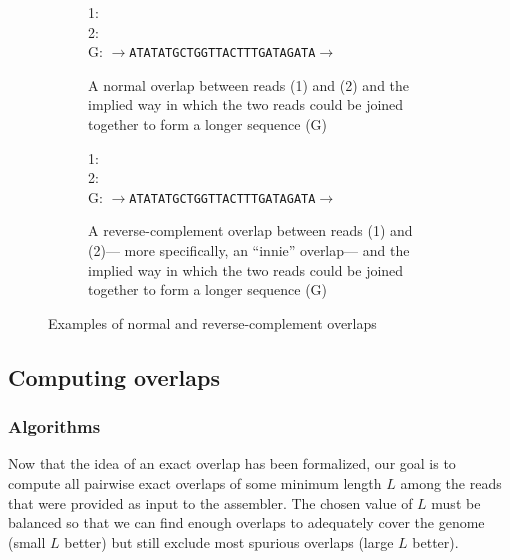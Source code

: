 \documentclass[12pt]{article}
\begin{document}
\begin{figure}
	\centering
	\begin{subfigure}[t]{0.455\textwidth}
		1:  \\
		2:  \\
		G: {\tt $\rightarrow$ATATATGCTGGTTACTTTGATAGATA$\rightarrow$}
		\caption{A normal overlap between reads (1) and (2) and the
		implied way in which the two reads could be joined together to
		form a longer sequence (G)}
	\end{subfigure}
		\hspace{0.07\textwidth}
	\begin{subfigure}[t]{0.455\textwidth}
		1:  \\
		2:  \\
		G: {\tt $\rightarrow$ATATATGCTGGTTACTTTGATAGATA$\rightarrow$}
		\caption{A reverse-complement overlap between reads (1) and
		(2)--- more specifically, an ``innie'' overlap--- and the
		implied way in which the two reads could be joined together to
		form a longer sequence (G)}
	\end{subfigure}
	\caption{Examples of normal and reverse-complement overlaps}
	\label{fig:overlap_examples}
\end{figure}

\subsection{Computing overlaps}

\subsubsection{Algorithms}

Now that the idea of an exact overlap has been formalized, our goal is to
compute all pairwise exact overlaps of some minimum length $L$ among the reads
that were provided as input to the assembler.  The chosen value of $L$ must be
balanced so that we can find enough overlaps to adequately cover the genome
(small $L$ better) but still exclude most spurious overlaps (large $L$ better).
\end{document}
